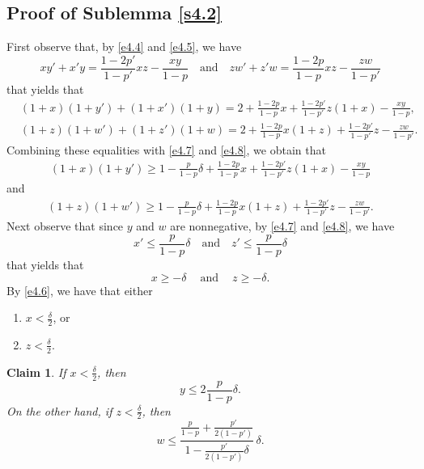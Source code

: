 \documentclass[10pt]{amsart}
\newtheorem{claim}[thm]{Claim}
\theoremstyle{remark}
\newcommand{\meg}{\geqslant}
\newcommand{\mik}{\leqslant}
\begin{document}
\subsection{Proof of Sublemma \ref{s4.2}} \label{subsec4.1}

First observe that, by \eqref{e4.4} and \eqref{e4.5}, we have
\begin{equation} \label{e4.12}
xy'+x'y =\frac{1-2p'}{1-p'}xz-\frac{xy}{1-p} \ \ \ \text{ and } \ \ \
zw'+z'w=\frac{1-2p}{1-p}xz-\frac{zw}{1-p'}
\end{equation}
that yields that
\begin{align}
\label{e4.13} & (1+x)(1+y')+(1+x')(1+y)=2+\frac{1-2p}{1-p}x+\frac{1-2p'}{1-p'}z(1+x)-\frac{xy}{1-p}, \\
\label{e4.14} & (1+z)(1+w')+(1+z')(1+w)=2+\frac{1-2p}{1-p}x(1+z)+\frac{1-2p'}{1-p'}z-\frac{zw}{1-p'}.
\end{align}
Combining these equalities with \eqref{e4.7} and \eqref{e4.8}, we obtain that
\begin{align} \label{e4.15}
(1+x)(1+y') \meg 1-\frac{p}{1-p}\delta +\frac{1-2p}{1-p}x+\frac{1-2p'}{1-p'}z(1+x)-\frac{xy}{1-p}
\end{align}
and
\begin{align} \label{e4.16}
(1+z)(1+w') \meg 1-\frac{p}{1-p}\delta + \frac{1-2p}{1-p}x(1+z)+\frac{1-2p'}{1-p'}z-\frac{zw}{1-p'}.
\end{align}
Next observe that since $y$ and $w$ are nonnegative, by \eqref{e4.7} and \eqref{e4.8}, we have
\begin{equation} \label{e4.17}
x'\mik\frac{p}{1-p}\delta \ \ \ \text{ and } \ \ \ z'\mik \frac{p}{1-p}\delta
\end{equation}
that yields that
\begin{equation} \label{e4.18}
x \meg-\delta \ \ \ \ \text{ and } \ \ \ \ z\meg-\delta.
\end{equation}
By \eqref{e4.6}, we have that either
\begin{enumerate}
\item[($\mathcal{A}1$)] $x<\frac{\delta}{2}$, or
\item[($\mathcal{A}2$)] $z<\frac{\delta}{2}$.
\end{enumerate}
\begin{claim} \label{c4.3}
If $x<\frac{\delta}{2}$, then
\begin{equation} \label{e4.19}
y\mik 2\frac{p}{1-p}\delta.
\end{equation}
On the other hand, if $z<\frac{\delta}{2}$, then
\begin{equation} \label{e4.20}
w\mik  \frac{\frac{p}{1-p}+\frac{p'}{2(1-p')}}{1-\frac{p'}{2(1-p')}\delta}\, \delta.
\end{equation}
\end{claim}
\end{document}
